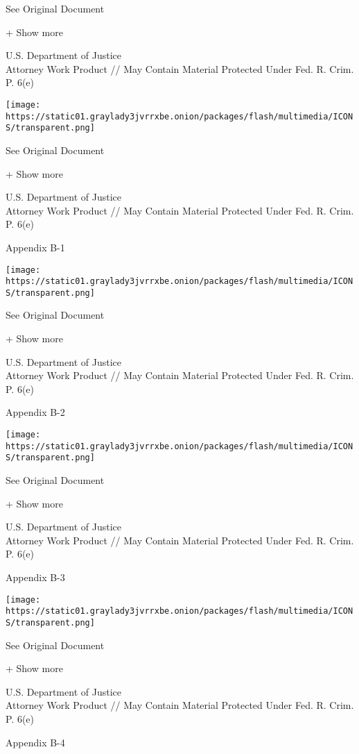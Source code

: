 See Original Document

+ Show more

U.S. Department of Justice\\
Attorney Work Product // May Contain Material Protected Under Fed. R.
Crim. P. 6(e)

\protect\hyperlink{}{}

\texttt{[image: https://static01.graylady3jvrrxbe.onion/packages/flash/multimedia/ICONS/transparent.png]}

See Original Document

+ Show more

U.S. Department of Justice\\
Attorney Work Product // May Contain Material Protected Under Fed. R.
Crim. P. 6(e)

Appendix B-1

\protect\hyperlink{}{}

\texttt{[image: https://static01.graylady3jvrrxbe.onion/packages/flash/multimedia/ICONS/transparent.png]}

See Original Document

+ Show more

U.S. Department of Justice\\
Attorney Work Product // May Contain Material Protected Under Fed. R.
Crim. P. 6(e)

Appendix B-2

\protect\hyperlink{}{}

\texttt{[image: https://static01.graylady3jvrrxbe.onion/packages/flash/multimedia/ICONS/transparent.png]}

See Original Document

+ Show more

U.S. Department of Justice\\
Attorney Work Product // May Contain Material Protected Under Fed. R.
Crim. P. 6(e)

Appendix B-3

\protect\hyperlink{}{}

\texttt{[image: https://static01.graylady3jvrrxbe.onion/packages/flash/multimedia/ICONS/transparent.png]}

See Original Document

+ Show more

U.S. Department of Justice\\
Attorney Work Product // May Contain Material Protected Under Fed. R.
Crim. P. 6(e)

Appendix B-4

